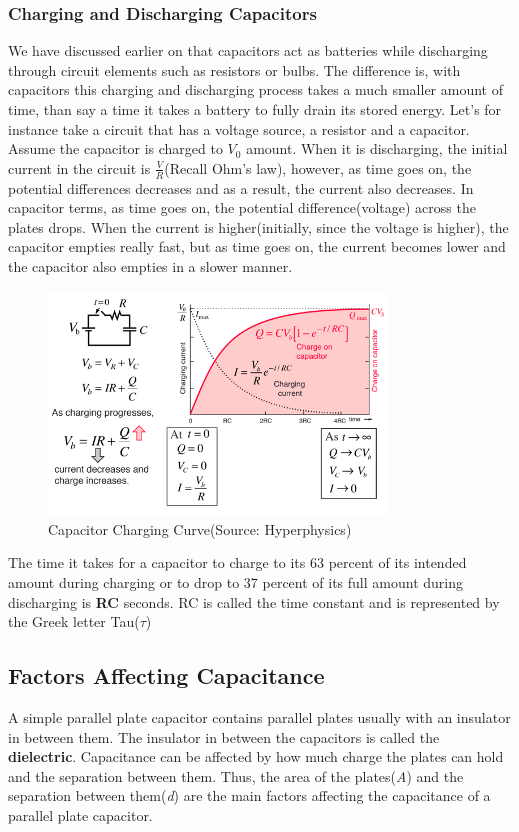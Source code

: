 \documentclass[9pt]{exam}
\begin{document}
	\subsubsection*{Charging and Discharging Capacitors}
	We have discussed earlier on that capacitors act as batteries while discharging through circuit elements such as resistors or bulbs. The difference is, with capacitors this charging and discharging process takes a much smaller amount of time, than say a time it takes a battery to fully drain its stored energy. Let's for instance take a circuit that has a voltage source, a resistor and a capacitor. Assume the capacitor is charged to $V_0$ amount. When it is discharging, the initial current in the circuit is $\frac{V}{R}$(Recall Ohm's law), however, as time goes on, the potential differences decreases and as a result, the current also decreases. In capacitor terms, as time goes on, the potential difference(voltage) across the plates drops. When the current is higher(initially, since the voltage is higher), the capacitor empties really fast, but as time goes on, the current becomes lower and the capacitor also empties in a slower manner. \newline
	\begin{figure}[htp]
		\centering
		\includegraphics[width=9cm]{curve.png}
		\caption{Capacitor Charging Curve(Source: Hyperphysics)}
		\label{fig:charge}
	\end{figure} \newline \newline
	The time it takes for a capacitor to charge to its 63 percent of its intended amount during charging or to drop to 37 percent of its full amount during discharging is \textbf{RC} seconds. RC is called the time constant and is represented by the Greek letter Tau($\tau$)
	
	\subsection*{Factors Affecting Capacitance}
	A simple parallel plate capacitor contains parallel plates usually with an insulator in between them. The insulator in between the capacitors is called the \textbf{dielectric}. Capacitance can be affected by how much charge the plates can hold and the separation between them. Thus, the area of the plates(\textit{A}) and the separation between them(\textit{d}) are the main factors affecting the capacitance of a parallel plate capacitor.
	
\end{document}
